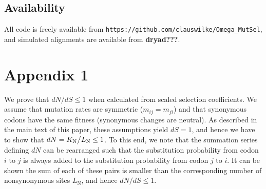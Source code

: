 \documentclass[11pt]{article}
\begin{document}
\subsection*{Availability}
All code is freely available from \texttt{https://github.com/clauswilke/Omega\_MutSel}, and simulated alignments are available from \textbf{dryad???}.



\section*{Appendix 1}
We prove that $dN/dS \leq 1$ when calculated from scaled selection coefficients. We assume that mutation rates are symmetric ($m_{ij} = m_{ji}$) and that synonymous codons have the same fitness (synonymous changes are neutral). As described in the main text of this paper, these assumptions yield $dS = 1$, and hence we have to show that $dN = K_\text{N}\big{/}L_\text{N} \leq 1$. To this end, we note that the summation series defining $dN$ can be rearranged such that the substitution probability from codon $i$ to $j$ is always added to the substitution probability from codon $j$ to $i$. It can be shown the sum of each of these pairs is smaller than the corresponding number of nonsynonymous sites $L_\text{N}$, and hence $dN/dS \leq 1$.
\end{document}
